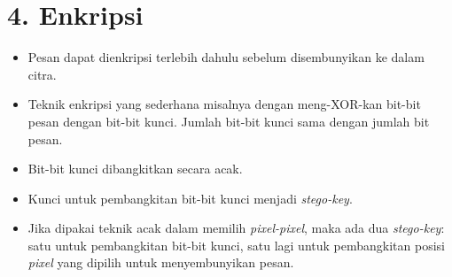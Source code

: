 \documentclass{article}
\begin{document}

\section*{4. Enkripsi}

\begin{itemize}
    \item Pesan dapat dienkripsi terlebih dahulu sebelum disembunyikan ke dalam citra.
    \item Teknik enkripsi yang sederhana misalnya dengan meng-XOR-kan bit-bit pesan dengan bit-bit kunci. Jumlah bit-bit kunci sama dengan jumlah bit pesan.
    \item Bit-bit kunci dibangkitkan secara acak.
    \item Kunci untuk pembangkitan bit-bit kunci menjadi \textit{stego-key}.
    \item Jika dipakai teknik acak dalam memilih \textit{pixel-pixel}, maka ada dua \textit{stego-key}: satu untuk pembangkitan bit-bit kunci, satu lagi untuk pembangkitan posisi \textit{pixel} yang dipilih untuk menyembunyikan pesan.
\end{itemize}
\end{document}
